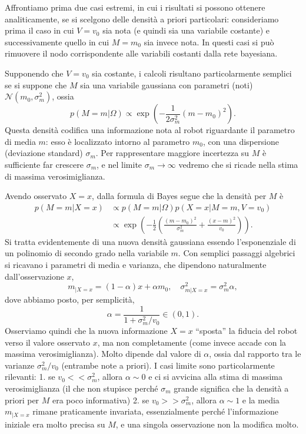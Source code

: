 \documentclass[
  italian,
  letterpaper,
]{book}
\newcommand{\bra}[1]{\left( #1 \right)}
\theoremstyle{definition}
\theoremstyle{remark}
\begin{document}
Affrontiamo prima due casi estremi, in cui i risultati si possono
ottenere analiticamente, se si scelgono delle densità a priori
particolari: consideriamo prima il caso in cui \(V = v_0\) sia nota (e
quindi sia una variabile costante) e successivamente quello in cui
\(M = m_0\) sia invece nota. In questi casi si può rimuovere il nodo
corrispondente alle variabili costanti dalla rete bayesiana.

Supponendo che \(V=v_0\) sia costante, i calcoli risultano
particolarmente semplici se si suppone che \(M\) sia una variabile
gaussiana con parametri (noti) \(\mathcal{N}(m_0, \sigma_m^2)\), ossia
\[ p(M= m| \Omega) \propto \exp\bra{-\frac 1 {2\sigma_m^2} (m-m_0)^2}.\]
Questa densità codifica una informazione nota al robot riguardante il
parametro di media \(m\): esso è localizzato intorno al parametro
\(m_0\), con una dispersione (deviazione standard) \(\sigma_m\). Per
rappresentare maggiore incertezza su \(M\) è sufficiente far crescere
\(\sigma_m\), e nel limite \(\sigma_m \to \infty\) vedremo che si ricade
nella stima di massima verosimiglianza.

Avendo osservato \(X=x\), dalla formula di Bayes segue che la densità
per \(M\) è
\[ \begin{split} p(M=m| X=x) & \propto p(M=m|\Omega ) p(X =x | M=m, V=v_0) \\
& \propto \exp\bra{ -\frac 1 2 \bra{ \frac{ (m-m_0)^2}{\sigma_m^2} + \frac { (x-m)^2}{v_0} }}.\end{split}\]
Si tratta evidentemente di una nuova densità gaussiana essendo
l'esponenziale di un polinomio di secondo grado nella variabile \(m\).
Con semplici passaggi algebrici si ricavano i parametri di media e
varianza, che dipendono naturalmente dall'osservazione \(x\),
\[ m_{|X=x} = (1-\alpha) x + \alpha m_0, \quad \sigma^2_{m|X=x} = \sigma_m^2\alpha,\]
dove abbiamo posto, per semplicità,
\[\alpha = \frac{1}{1+\sigma_m^2/v_0 } \in (0,1).\] Osserviamo quindi
che la nuova informazione \(X=x\) ``sposta'' la fiducia del robot verso
il valore osservato \(x\), ma non completamente (come invece accade con
la massima verosimiglianza). Molto dipende dal valore di \(\alpha\),
ossia dal rapporto tra le varianze \(\sigma_m^2/v_0\) (entrambe note a
priori). I casi limite sono particolarmente rilevanti: 1. se
\(v_0<< \sigma_m^2\), allora \(\alpha \sim 0\) e ci si avvicina alla
stima di massima verosimiglianza (il che non stupisce perché
\(\sigma_m\) grande significa che la densità a priori per \(M\) era poco
informativa) 2. se \(v_0>> \sigma_m^2\), allora \(\alpha \sim 1\) e la
media \(m_{|X=x}\) rimane praticamente invariata, essenzialmente perché
l'informazione iniziale era molto precisa su \(M\), e una singola
osservazione non la modifica molto.
\end{document}
